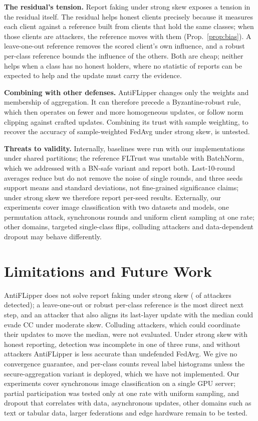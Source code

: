 \documentclass[journal]{IEEEtran}
\begin{document}
\textbf{The residual's tension.} Report faking under strong skew exposes a tension in the residual itself. The residual helps honest clients precisely because it measures each client against a reference built from clients that hold the same classes; when those clients are attackers, the reference moves with them (Prop.~\ref{prop:bias}). A leave-one-out reference removes the scored client's own influence, and a robust per-class reference bounds the influence of the others. Both are cheap; neither helps when a class has no honest holders, where no statistic of reports can be expected to help and the update must carry the evidence.

\textbf{Combining with other defenses.} AntiFLipper changes only the weights and membership of aggregation. It can therefore precede a Byzantine-robust rule, which then operates on fewer and more homogeneous updates, or follow norm clipping against crafted updates. Combining its trust with sample weighting, to recover the accuracy of sample-weighted FedAvg under strong skew, is untested.

\textbf{Threats to validity.} Internally, baselines were run with our implementations under shared partitions; the reference FLTrust was unstable with BatchNorm, which we addressed with a BN-safe variant and report both. Last-10-round averages reduce but do not remove the noise of single rounds, and three seeds support means and standard deviations, not fine-grained significance claims; under strong skew we therefore report per-seed results. Externally, our experiments cover image classification with two datasets and models, one permutation attack, synchronous rounds and uniform client sampling at one rate; other domains, targeted single-class flips, colluding attackers and data-dependent dropout may behave differently.

\section{Limitations and Future Work}
\label{sec:limits}
AntiFLipper does not solve report faking under strong skew (\fsFound{} of \fsTotal{} attackers detected); a leave-one-out or robust per-class reference is the most direct next step, and an attacker that also aligns its last-layer update with the median could evade CC under moderate skew. Colluding attackers, which could coordinate their updates to move the median, were not evaluated. Under strong skew with honest reporting, detection was incomplete in one of three runs, and without attackers AntiFLipper is less accurate than undefended FedAvg. We give no convergence guarantee, and per-class counts reveal label histograms unless the secure-aggregation variant is deployed, which we have not implemented. Our experiments cover synchronous image classification on a single GPU server; partial participation was tested only at one rate with uniform sampling, and dropout that correlates with data, asynchronous updates, other domains such as text or tabular data, larger federations and edge hardware remain to be tested.
\end{document}

